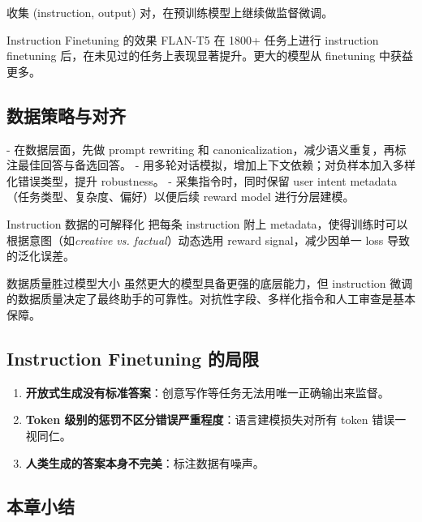 \documentclass[a4paper]{article}
\begin{document}
收集 (instruction, output) 对，在预训练模型上继续做监督微调。

\begin{importantbox}{Instruction Finetuning 的效果}
FLAN-T5 在 1800+ 任务上进行 instruction finetuning 后，在未见过的任务上表现显著提升。更大的模型从 finetuning 中获益更多。
\end{importantbox}

\subsection{数据策略与对齐}

- 在数据层面，先做 prompt rewriting 和 canonicalization，减少语义重复，再标注最佳回答与备选回答。
- 用多轮对话模拟，增加上下文依赖；对负样本加入多样化错误类型，提升 robustness。
- 采集指令时，同时保留 user intent metadata（任务类型、复杂度、偏好）以便后续 reward model 进行分层建模。

\begin{knowledgebox}{Instruction 数据的可解释化}
把每条 instruction 附上 metadata，使得训练时可以根据意图（如\textit{creative vs. factual}）动态选用 reward signal，减少因单一 loss 导致的泛化误差。
\end{knowledgebox}

\begin{importantbox}{数据质量胜过模型大小}
虽然更大的模型具备更强的底层能力，但  instruction 微调的数据质量决定了最终助手的可靠性。对抗性字段、多样化指令和人工审查是基本保障。
\end{importantbox}

\subsection{Instruction Finetuning 的局限}

\begin{enumerate}
    \item \textbf{开放式生成没有标准答案}：创意写作等任务无法用唯一正确输出来监督。
    \item \textbf{Token 级别的惩罚不区分错误严重程度}：语言建模损失对所有 token 错误一视同仁。
    \item \textbf{人类生成的答案本身不完美}：标注数据有噪声。
\end{enumerate}

\subsection{本章小结}
\end{document}
